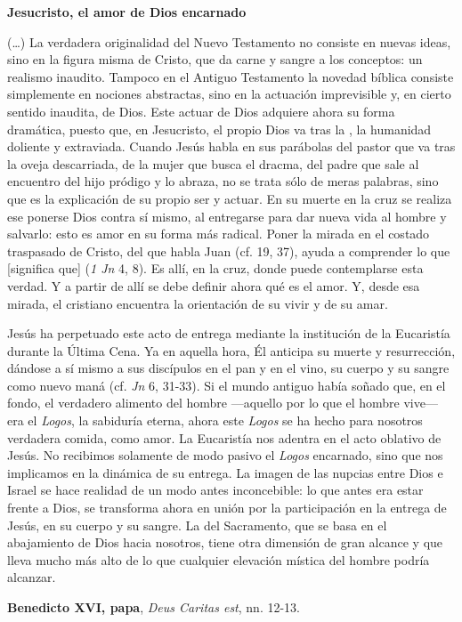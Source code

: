 \begin{patercite}
\textbf{Jesucristo, el amor de Dios encarnado}

(\ldots) La verdadera originalidad del Nuevo Testamento no consiste en nuevas ideas, sino en la figura misma de Cristo, que da carne y sangre a los conceptos: un realismo inaudito. Tampoco en el Antiguo Testamento la novedad bíblica consiste simplemente en nociones abstractas, sino en la actuación imprevisible y, en cierto sentido inaudita, de Dios. Este actuar de Dios adquiere ahora su forma dramática, puesto que, en Jesucristo, el propio Dios va tras la , la humanidad doliente y extraviada. Cuando Jesús habla en sus parábolas del pastor que va tras la oveja descarriada, de la mujer que busca el dracma, del padre que sale al encuentro del hijo pródigo y lo abraza, no se trata sólo de meras palabras, sino que es la explicación de su propio ser y actuar. En su muerte en la cruz se realiza ese ponerse Dios contra sí mismo, al entregarse para dar nueva vida al hombre y salvarlo: esto es amor en su forma más radical. Poner la mirada en el costado traspasado de Cristo, del que habla Juan (cf. 19, 37), ayuda a comprender lo que [significa que]  (\textit{1 Jn} 4, 8). Es allí, en la cruz, donde puede contemplarse esta verdad. Y a partir de allí se debe definir ahora qué es el amor. Y, desde esa mirada, el cristiano encuentra la orientación de su vivir y de su amar.

Jesús ha perpetuado este acto de entrega mediante la institución de la Eucaristía durante la Última Cena. Ya en aquella hora, Él anticipa su muerte y resurrección, dándose a sí mismo a sus discípulos en el pan y en el vino, su cuerpo y su sangre como nuevo maná (cf. \textit{Jn} 6, 31-33). Si el mundo antiguo había soñado que, en el fondo, el verdadero alimento del hombre ---aquello por lo que el hombre vive--- era el \textit{Logos}, la sabiduría eterna, ahora este \textit{Logos} se ha hecho para nosotros verdadera comida, como amor. La Eucaristía nos adentra en el acto oblativo de Jesús. No recibimos solamente de modo pasivo el \textit{Logos} encarnado, sino que nos implicamos en la dinámica de su entrega. La imagen de las nupcias entre Dios e Israel se hace realidad de un modo antes inconcebible: lo que antes era estar frente a Dios, se transforma ahora en unión por la participación en la entrega de Jesús, en su cuerpo y su sangre. La  del Sacramento, que se basa en el abajamiento de Dios hacia nosotros, tiene otra dimensión de gran alcance y que lleva mucho más alto de lo que cualquier elevación mística del hombre podría alcanzar.

\textbf{Benedicto XVI, papa}, \textit{Deus Caritas est}, nn. 12-13.
\end{patercite}
\label{b2-03-02-2018H}
\newpage


